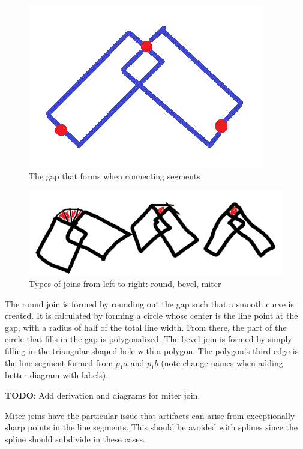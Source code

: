 \documentclass[12pt]{report}
\begin{document}
\begin{figure}
	\includegraphics[width=\textwidth]{linesegment2.png}
	\caption{The gap that forms when connecting segments}
\end{figure}

\begin{figure}
	\includegraphics[width=\textwidth]{jointypes.jpg}
	\caption{Types of joins from left to right: round, bevel, miter}
\end{figure}
The round join is formed by rounding out the gap such that a smooth curve is created. 
It is calculated by forming a circle whose center is the line point at the gap, with a radius of half of the total line width. 
From there, the part of the circle that fills in the gap is polygonalized.
The bevel join is formed by simply filling in the triangular shaped hole with a polygon. 
The polygon's third edge is the line segment formed from $p_1a$ and $p_1b$ (note change names when adding better diagram with labels).

\noindent \textbf{TODO}: Add derivation and diagrams for miter join.

Miter joins have the particular issue that artifacts can arise from exceptionally sharp points in the line segments. 
This should be avoided with splines since the spline should subdivide in these cases.
\end{document}

